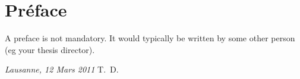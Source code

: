 \chapter*{Préface}
A preface is not mandatory. It would typically be written by some other person (eg your thesis director).

\lipsum[1-2]

\bigskip
 
\noindent\textit{Lausanne, 12 Mars 2011}
\hfill T.~D.
